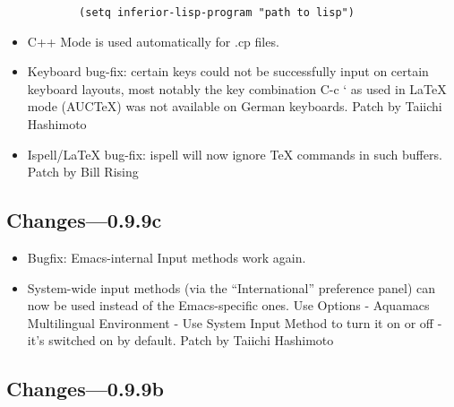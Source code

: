 \begin{itemize}
\begin{verbatim}
        (setq inferior-lisp-program "path to lisp")
\end{verbatim}


\item  C++ Mode is used automatically for .cp files.

\item  Keyboard bug-fix: certain keys could not be successfully input
        on certain keyboard layouts, most notably the key combination
        C-c ` as used in LaTeX mode (AUCTeX) was not available on German
        keyboards.
        Patch by Taiichi Hashimoto

\item  Ispell/LaTeX bug-fix: ispell will now ignore TeX commands in
        such buffers.
        Patch by Bill Rising


\end{itemize}

\subsection{Changes---0.9.9c}

\begin{itemize}

\item Bugfix: Emacs-internal Input methods work again.

\item System-wide input methods (via the ``International'' preference
        panel) can now be used instead of the Emacs-specific ones.  Use
        Options - Aquamacs Multilingual Environment - Use System Input Method
        to turn it on or off - it's switched on by default.
        Patch by Taiichi Hashimoto
\end{itemize}

\subsection{Changes---0.9.9b}

